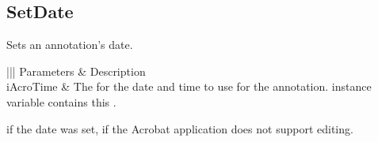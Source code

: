 \documentclass[letterpaper,12pt,english,openany,oneside]{sphinxmanual}
\begin{document}
\subsection{SetDate}
\label{\detokenize{IAC_API_OLE_Objects:setdate}}
Sets an annotation’s date.


\begin{sphinxVerbatim}[commandchars=\\\{\}]
  
\end{sphinxVerbatim}
\label{\detokenize{IAC_API_OLE_Objects:parameters-43}}


\begin{savenotes}\sphinxattablestart
\centering
{}\label{\detokenize{IAC_API_OLE_Objects:section-48}}\nobreak
\begin{tabular}[t]{|||}
\hline
\sphinxstyletheadfamily 
Parameters
&\sphinxstyletheadfamily 
Description
\\
\hline
iAcroTime
&
The  for the date and time to use for the annotation.  instance variable  contains this .
\\
\hline
\end{tabular}
\par
\sphinxattableend\end{savenotes}


 if the date was set,  if the Acrobat application does not support editing.
\end{document}
